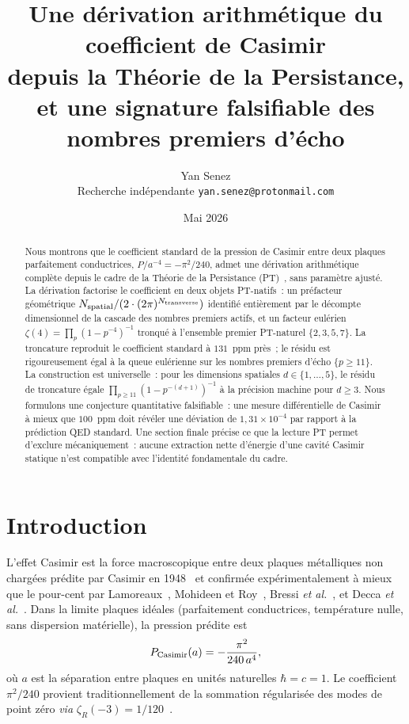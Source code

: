 \documentclass[11pt,a4paper]{article}
\title{\textbf{Une dérivation arithmétique du coefficient de Casimir}\\
       {\large depuis la Théorie de la Persistance, et une signature falsifiable des nombres premiers d'écho}}
\author{Yan Senez \\ {\small Recherche indépendante \quad \texttt{yan.senez@protonmail.com}}}
\date{Mai 2026}
\newcommand{\zetaR}{\zeta_R}
\newcommand{\PTset}{\{2,3,5,7\}}
\newcommand{\echoes}{\{p \geq 11\}}
\newcommand{\Nspatial}{N_{\rm spatial}}
\newcommand{\Ntrans}{N_{\rm transverse}}
\begin{document}
\maketitle

\begin{abstract}
Nous montrons que le coefficient standard de la pression de Casimir entre deux plaques parfaitement
conductrices, $P/a^{-4} = -\pi^{2}/240$, admet une dérivation arithmétique complète depuis le cadre
de la Théorie de la Persistance (PT)~\cite{Senez2026}, sans paramètre ajusté. La dérivation
factorise le coefficient en deux objets PT-natifs~: un préfacteur géométrique
$\Nspatial / (2 \cdot (2\pi)^{\Ntrans})$ identifié entièrement par le décompte dimensionnel
de la cascade des nombres premiers actifs, et un facteur eulérien
$\zeta(4) = \prod_{p}(1-p^{-4})^{-1}$ tronqué à l'ensemble premier PT-naturel
$\PTset$. La troncature reproduit le coefficient standard à $131$~ppm près~; le résidu
est rigoureusement égal à la queue eulérienne sur les nombres premiers d'écho $\echoes$. La
construction est universelle~: pour les dimensions spatiales $d \in \{1,\dots,5\}$, le résidu de
troncature égale $\prod_{p \geq 11}(1-p^{-(d+1)})^{-1}$ à la précision machine pour $d \geq 3$.
Nous formulons une conjecture quantitative falsifiable~: une mesure différentielle de Casimir à
mieux que $100$~ppm doit révéler une déviation de $1{,}31 \times 10^{-4}$ par rapport à la
prédiction QED standard. Une section finale précise ce que la lecture PT permet d'exclure
mécaniquement~: aucune extraction nette d'énergie d'une cavité Casimir statique n'est compatible
avec l'identité fondamentale du cadre.
\end{abstract}

\section{Introduction}

L'effet Casimir est la force macroscopique entre deux plaques métalliques non chargées prédite
par Casimir en 1948~\cite{Casimir1948} et confirmée expérimentalement à mieux que le pour-cent par
Lamoreaux~\cite{Lamoreaux1997}, Mohideen et Roy~\cite{Mohideen1998},
Bressi \emph{et al.}~\cite{Bressi2002}, et Decca \emph{et al.}~\cite{Decca2003,Decca2007}. Dans la
limite plaques idéales (parfaitement conductrices, température nulle, sans dispersion matérielle),
la pression prédite est
\begin{equation}
P_{\rm Casimir}(a) = -\frac{\pi^{2}}{240\,a^{4}},
\label{eq:standard-coefficient}
\end{equation}
où $a$ est la séparation entre plaques en unités naturelles $\hbar = c = 1$. Le coefficient
$\pi^{2}/240$ provient traditionnellement de la sommation régularisée des modes de point zéro
\emph{via} $\zetaR(-3) = 1/120$~\cite{Mostepanenko2009,Milton2001}.
\end{document}
